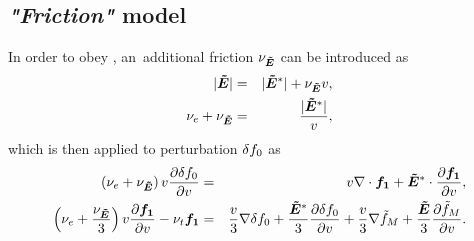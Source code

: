 \subsection{\textit{"Friction"} model}
\label{sec:OOE_stable_splitting}
\newcommand{\nuE}{\nu_{\tE}}
In order to obey , an~additional friction
$\nu_{\boldsymbol{\tilde{E}}}$ can be introduced as
\begin{eqnarray}
  |\tE| &=& |\tE^*| + \nuE \vmag  ,
  \nonumber \\
  \nue + \nuE &=& \frac{|\tE^*|}{\vmag} ,
  \nonumber
\end{eqnarray}
which is then applied to perturbation $\delta f_0$ as
\begin{eqnarray}
  \left(\nue + \nuE\right) \vmag \pdv{\dafzero}{\vmag} &=&
  \vmag\nabla\cdot\fone + \tE^*\cdot\pdv{\fone}{\vmag} , 
  \nonumber\\
  \left(\nue + \frac{\nuE}{3}\right) \vmag\pdv{\fone}{\vmag} - \nutot\fone &=& 
  \frac{\vmag}{3}\nabla\dafzero + 
  \frac{\tE^*}{3}\pdv{\dafzero}{\vmag}
  + \frac{\vmag}{3}\nabla\tfM + \frac{\tE}{3}\pdv{\tfM}{\vmag} .
  \nonumber
\end{eqnarray}

